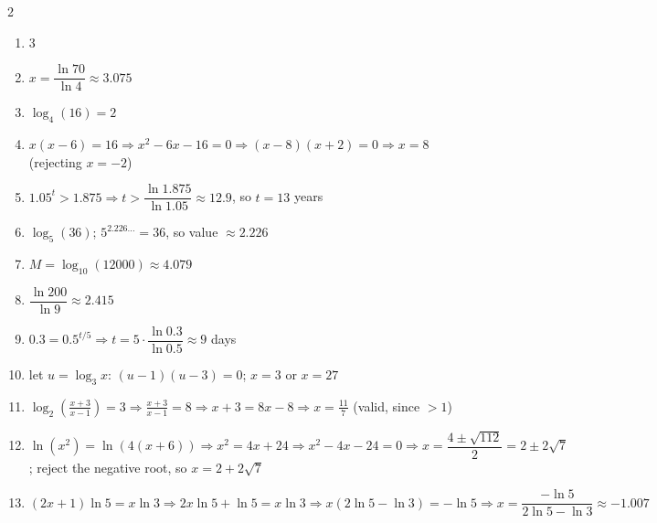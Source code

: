 \documentclass[11pt]{article}
\begin{document}
\begin{keybox}
\begin{multicols}{2}
\small
\begin{enumerate}[leftmargin=*,itemsep=3pt]
  \item $3$
  \item $x=\dfrac{\ln70}{\ln4}\approx3.075$
  \item $\log_4(16)=2$
  \item $x(x-6)=16\Rightarrow x^2-6x-16=0\Rightarrow(x-8)(x+2)=0\Rightarrow x=8$ (rejecting $x=-2$)
  \item $1.05^t>1.875\Rightarrow t>\dfrac{\ln1.875}{\ln1.05}\approx12.9$, so $t=13$ years
  \item $\log_5(36)$; $5^{2.226\ldots}=36$, so value $\approx2.226$
  \item $M=\log_{10}(12000)\approx4.079$
  \item $\dfrac{\ln200}{\ln9}\approx2.415$
  \item $0.3=0.5^{t/5}\Rightarrow t=5\cdot\dfrac{\ln0.3}{\ln0.5}\approx9$ days
  \item let $u=\log_3x$: $(u-1)(u-3)=0$; $x=3$ or $x=27$
  \item $\log_2\!\left(\tfrac{x+3}{x-1}\right)=3\Rightarrow\tfrac{x+3}{x-1}=8\Rightarrow x+3=8x-8\Rightarrow x=\tfrac{11}{7}$ (valid, since $>1$)
  \item $\ln(x^2)=\ln(4(x+6))\Rightarrow x^2=4x+24\Rightarrow x^2-4x-24=0\Rightarrow x=\dfrac{4\pm\sqrt{112}}{2}=2\pm2\sqrt7$; reject the negative root, so $x=2+2\sqrt7$
  \item $(2x+1)\ln5=x\ln3\Rightarrow2x\ln5+\ln5=x\ln3\Rightarrow x(2\ln5-\ln3)=-\ln5\Rightarrow x=\dfrac{-\ln5}{2\ln5-\ln3}\approx-1.007$
\end{enumerate}
\end{multicols}
\end{keybox}
\end{document}
